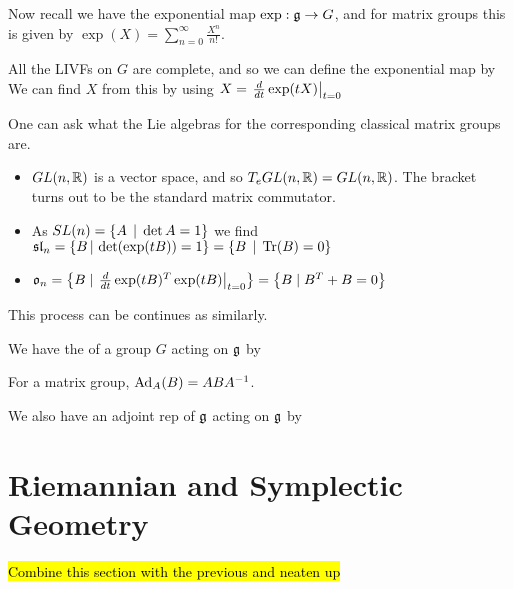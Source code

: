 \documentclass{article}
\begin{document}
Now recall we have the exponential map $\exp : \mathfrak{g} \to G$, and for matrix groups this is given by $\exp(X) = \sum_{n=0}^\infty \frac{X^n}{n!}$. 

\begin{remark}
All the LIVFs on $G$ are complete, and so we can define the exponential map by 
We can find $X$ from this by using $X = \left. \frac{d}{dt} \exp(tX) \right\rvert_{t=0}$
\end{remark}

\begin{example} 
One can ask what the Lie algebras for the corresponding classical matrix groups are. 
\begin{itemize}
    \item $GL(n,\mathbb{R})$ is a vector space, and so $T_e GL(n,\mathbb{R}) = GL(n,\mathbb{R})$. The bracket turns out to be the standard matrix commutator. 
    \item As $SL(n) = \left\{ A \, \mid \, \det A = 1 \right\}$ we find $\mathfrak{sl}_n = \left\{ B \, | \, \det(\exp(tB)) = 1 \right\} = \left\{ B \, \mid \, \operatorname{Tr}(B) = 0 \right\}$
    \item $\mathfrak{o}_n = \left\{ B  \mid  \left. \frac{d}{dt} \exp(tB)^T \exp(tB) \right\rvert_{t=0} \right\} = \left\{ B  \mid B^T + B = 0  \right\}$
\end{itemize}
This process can be continues as similarly. 
\end{example}

\begin{definition}
We have the  of a group $G$ acting on $\mathfrak{g}$ by 
\end{definition}

\begin{lemma}
For a matrix group, $\operatorname{Ad}_A(B) = ABA^{-1}$. 
\end{lemma}

\begin{definition}
We also have an adjoint rep of $\mathfrak{g}$ acting on $\mathfrak{g}$ by 
\end{definition}
\section{Riemannian and Symplectic Geometry}
\hl{Combine this section with the previous and neaten up }
\end{document}
